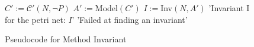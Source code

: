 \begin{figure}
  \begin{algorithmic}[1]
    \State $C' := \mathcal C'(N, \neg P)$
    \State $A' := $Model$(C')$
    \State $I := $Inv$(N, A')$
    \State \Return 'Invariant I for the petri net: $I$'
    \Else
    \State \Return 'Failed at finding an invariant'
    \EndIf
  \end{algorithmic}
  \caption{Pseudocode for Method Invariant}
  \label{fig:method-invariant-pseudocode}
\end{figure}

